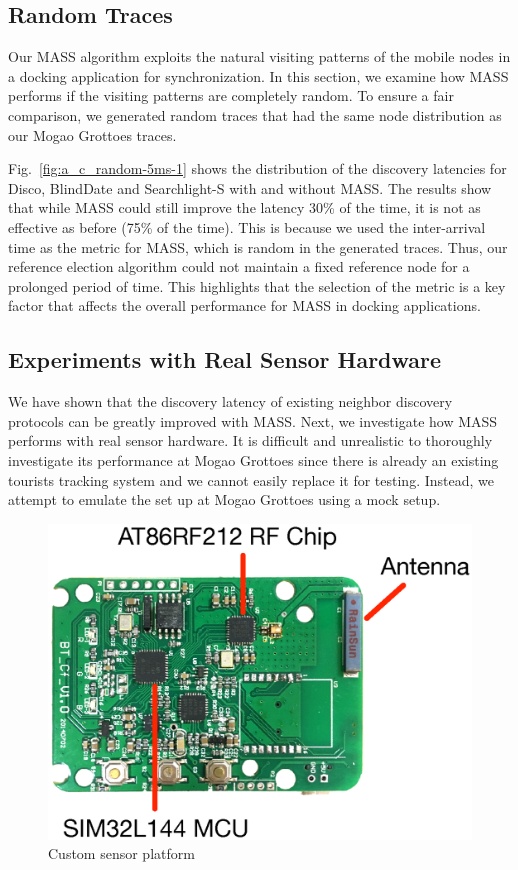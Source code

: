 \documentclass[twoside,twocolumn]{article}
\begin{document}
\subsection{Random Traces}

Our MASS algorithm exploits the natural visiting patterns of the
mobile nodes in a docking application for synchronization.  In this
section, we examine how MASS performs if the visiting patterns are
completely random. To ensure a fair comparison, we generated random
traces that had the same node distribution as our Mogao Grottoes
traces.

Fig.~\ref{fig:a_c_random-5ms-1} shows the distribution of the
discovery latencies for Disco, BlindDate and Searchlight-S with and
without MASS. The results show that while MASS could still improve the
latency 30\% of the time, it is not as effective as before (75\% of
the time).  This is because we used the inter-arrival time as the
metric for MASS, which is random in the generated traces. Thus, our
reference election algorithm could not maintain a fixed reference node
for a prolonged period of time. This highlights that the selection of
the metric is a key factor that affects the overall performance for
MASS in docking applications.

\subsection{Experiments with Real Sensor Hardware}
\label{sec:mock-up}
We have shown that the discovery latency of existing neighbor discovery
protocols can be greatly improved with MASS. Next, we investigate how MASS 
performs with real sensor hardware. It is difficult and
unrealistic to thoroughly investigate its performance at Mogao Grottoes
since there is already an existing tourists tracking system and we cannot
easily replace it for testing. Instead, we attempt to emulate the set up
at Mogao Grottoes using a mock setup.

\begin{figure}[t]
   \centering
   \includegraphics[width=.7\columnwidth]{static/sensor}
   \caption{Custom sensor platform}
   \label{fig:node}
\end{figure}
\end{document}
